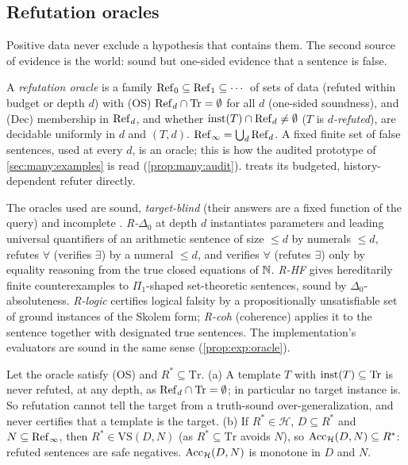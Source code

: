 \subsection{Refutation oracles}\label{sec:setting:refutation}

Positive data never exclude a hypothesis that contains them. The second source of evidence is the world: sound but one-sided evidence that a sentence is false.

\begin{definition}\label{def:setting:oracle}
A \emph{refutation oracle} is a family $\mathrm{Ref}_0\subseteq\mathrm{Ref}_1\subseteq\cdots$ of sets of data (refuted within budget or depth $d$) with (OS) $\mathrm{Ref}_d\cap\mathrm{Tr}=\emptyset$ for all $d$ (one-sided soundness), and (Dec) membership in $\mathrm{Ref}_d$, and whether $\mathrm{inst}(T)\cap\mathrm{Ref}_d\neq\emptyset$ ($T$ is \emph{$d$-refuted}), are decidable uniformly in $d$ and $(T,d)$. $\mathrm{Ref}_\infty=\bigcup_d\mathrm{Ref}_d$. A fixed finite set of false sentences, used at every $d$, is an oracle; this is how the audited prototype of \cref{sec:many:examples} is read (\cref{prop:many:audit}).  treats its budgeted, history-dependent refuter directly.
\end{definition}

The oracles used are sound, \emph{target-blind} (their answers are a fixed function of the query) and incomplete . \emph{R-$\Delta_0$} at depth $d$ instantiates parameters and leading universal quantifiers of an arithmetic sentence of size $\le d$ by numerals $\le d$, refutes $\forall$ (verifies $\exists$) by a numeral $\le d$, and verifies $\forall$ (refutes $\exists$) only by equality reasoning from the true closed equations of $\mathbb{N}$. \emph{R-HF} gives hereditarily finite counterexamples to $\Pi_1$-shaped set-theoretic sentences, sound by $\Delta_0$-absoluteness. \emph{R-logic} certifies logical falsity by a propositionally unsatisfiable set of ground instances of the Skolem form; \emph{R-coh} (coherence) applies it to the sentence together with designated true sentences. The implementation's evaluators are sound in the same sense (\cref{prop:exp:oracle}).

\begin{lemma}\label{lem:setting:onesided}
Let the oracle satisfy (OS) and $R^*\subseteq\mathrm{Tr}$.
\textup{(a)} A template $T$ with $\mathrm{inst}(T)\subseteq\mathrm{Tr}$ is never refuted, at any depth, as $\mathrm{Ref}_d\cap\mathrm{Tr}=\emptyset$; in particular no target instance is. So refutation cannot tell the target from a truth-sound over-generalization, and never certifies that a template is the target.
\textup{(b)} If $R^*\in\mathcal H$, $D\subseteq R^*$ and $N\subseteq\mathrm{Ref}_\infty$, then $R^*\in\mathrm{VS}(D,N)$ (as $R^*\subseteq\mathrm{Tr}$ avoids $N$), so $\mathrm{Acc}_{\mathcal H}(D,N)\subseteq R^*$: refuted sentences are safe negatives. $\mathrm{Acc}_{\mathcal H}(D,N)$ is monotone in $D$ and $N$.
\end{lemma}

